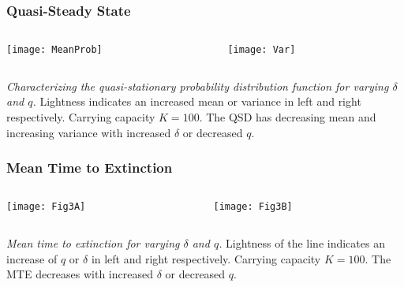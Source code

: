 \documentclass{beamer}
\begin{document}
\begin{frame}
\frametitle{Quasi-Steady State}
\begin{columns}
	\begin{column}{6cm}
		\begin{center}
			\texttt{[image: MeanProb]}
		\end{center}
	\end{column}
	\begin{column}{6cm}
		\begin{center}
			\texttt{[image: Var]}
		\end{center}
	\end{column}
\end{columns}
\justifying
\emph{Characterizing the quasi-stationary probability distribution function for varying $\delta$ and $q$.} 
Lightness indicates an increased mean or variance in left and right respectively. Carrying capacity $K=100$. 
The QSD has decreasing mean and increasing variance with increased $\delta$ or decreased $q$. 
\end{frame}


\begin{frame}
\frametitle{Mean Time to Extinction}
\begin{columns}
	\begin{column}{6cm}
		\begin{center}
			\texttt{[image: Fig3A]}
		\end{center}
	\end{column}
	\begin{column}{6cm}
		\begin{center}
			\texttt{[image: Fig3B]}
		\end{center}
	\end{column}
\end{columns}
\justifying
\emph{Mean time to extinction for varying $\delta$ and $q$.} 
Lightness of the line indicates an increase of $q$ or $\delta$ in left and right respectively. 
Carrying capacity $K=100$. 
The MTE decreases with increased $\delta$ or decreased $q$. 
\end{frame}
\end{document}
